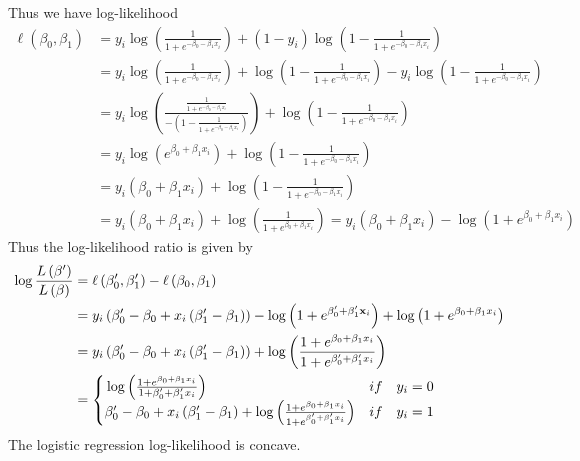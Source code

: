 Thus we have log-likelihood 
\begin{equation}\label{eq:logist_loglik_example}
\begin{split}
   \ell\left(\beta_0, \beta_1\right) &=  y_i\log\left(\frac{1}{1+e^{-\beta_0 - \beta_1x_i}}\right) + \left(1 -y_i\right) \log \left(1 - \frac{1}{1 + e^{-\beta_0 - \beta_1x_i}}\right)\\
    &= y_i\log\left(\frac{1}{1+e^{-\beta_0 - \beta_1 x_i}}\right) + \log\left(1 - \frac{1}{1 + e^{-\beta_0 - \beta_1x_i}}\right) - y_i\log\left(1 - \frac{1}{1 + e ^{-\beta_0 - \beta_1 x_i}}\right) \\
    & = y_i \log\left(\frac{\frac{1}{1+e^{-\beta_0 - \beta_1x_i}}}{-\left(1 - \frac{1}{1+e^{-\beta_0 - \beta_1 x_i}}\right)}\right) + \log \left(1 - \frac{1}{1 + e^{-\beta_0  -\beta_1 x_i}}\right)
    \\& = y_i\log\left(e^{\beta_0  +\beta_1 x_i }\right) + \log \left(1 - \frac{1}{1 + e^{-\beta_0 - \beta_1 x_i}}\right) \\
    & = y_i\left(\beta_0  +\beta_1 x_i\right) + \log \left(1 - \frac{1}{1 + e^{-\beta_0 - \beta_1 x_i}}\right) \\ 
    &= y_i\left(\beta_0 + \beta_1 x_i \right) + \log \left(\frac{1}{1 + e^{\beta_0 + \beta_1 x_i}}\right) = y_i\left(\beta_0 + \beta_1 x_i \right) - \log \left( 1 + e^{\beta_0  + \beta_1 x_i }\right)
    \end{split}
\end{equation}{}
Thus the log-likelihood ratio is given by 
\begin{equation}
\begin{split}
    \log\frac{L\left(\beta'\right)}{L\left(\beta\right)} &= \ell\left(\beta_0', \beta_1'\right) -  \ell \left(\beta_0,\beta_1\right)\\
    & = y_i\left(\beta_0' - \beta_0 + x_i \left(\beta_1' - \beta_1\right)\right) - \log \left(1 + e^{\beta_0' + \beta_1' \mathbf{x}_i}\right) + \log \left(1 + e^{\beta_0 +  \beta_1 x_i}\right) \\
    & = y_i\left(\beta_0' - \beta_0 + x_i\left(\beta_1' - \beta_1\right)\right) + \log \left(\frac{1 + e^{\beta_0 + \beta_1 x_i}}{1 + e^{\beta_0' + \beta_1' x_i}}\right) 
    \\
    & = \begin{cases}{} 
        \log \left(\frac{1 + e^{\beta_0 + \beta_1 x_i}}{1 + \beta_0' + \beta_1' x_i}\right) & if \quad y_i = 0 \\
        \beta_0' - \beta_0 + x_i \left(\beta_1' - \beta_1\right) + \log \left(\frac{1 + e^{\beta_0 + \beta_1 x_i}}{1 + e^{\beta_0' + \beta_1'x_i}}\right)  & if \quad y_i = 1
    \end{cases}
\end{split}
\end{equation}
The logistic regression log-likelihood is concave. 


